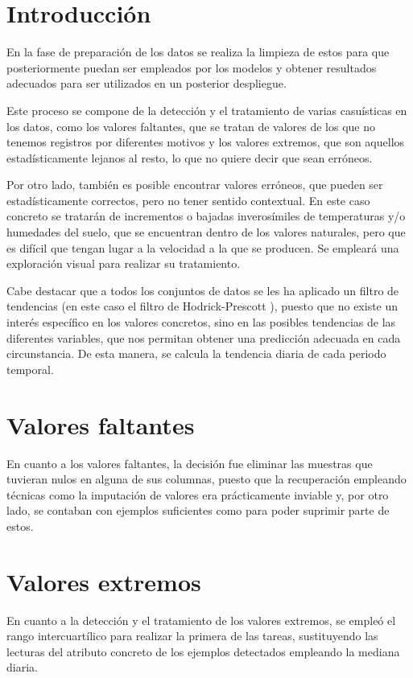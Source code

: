 
\section{Introducción}
En la fase de preparación de los datos se realiza la limpieza de estos para 
que posteriormente puedan ser empleados por los modelos y obtener resultados adecuados
para ser utilizados en un posterior despliegue.

Este proceso se compone de la detección y el tratamiento de varias casuísticas en 
los datos, como los valores faltantes, que se tratan de valores de los que no tenemos
registros por diferentes motivos y los valores extremos, que son aquellos
estadísticamente lejanos al resto, lo que no quiere decir que sean erróneos.

Por otro lado, también es posible encontrar valores erróneos, que pueden ser 
estadísticamente correctos, pero no tener sentido contextual. En este
caso concreto se tratarán de incrementos o bajadas inverosímiles de temperaturas 
y/o humedades del suelo, que se encuentran dentro de los valores naturales,
pero que es difícil que tengan lugar a la velocidad a la que se producen.
Se empleará una exploración visual para realizar su tratamiento. 

Cabe destacar que a todos los conjuntos de datos se les ha aplicado un filtro de 
tendencias (en este caso el filtro de Hodrick-Prescott \cite{misc:wikipediaHodrick2023}), 
puesto que no existe un interés específico en los valores concretos, sino en las posibles 
tendencias de las diferentes variables, que nos permitan obtener una predicción adecuada 
en cada circunstancia.
De esta manera, se calcula la tendencia diaria de cada periodo temporal.

\section{Valores faltantes}
En cuanto a los valores faltantes, la decisión fue eliminar las muestras que tuvieran
nulos en alguna de sus columnas, puesto que la recuperación empleando técnicas
como la imputación de valores era prácticamente inviable y, por otro lado, se contaban
con ejemplos suficientes como para poder suprimir parte de estos.

\section{Valores extremos}
En cuanto a la detección y el tratamiento de los valores extremos, se empleó el 
rango intercuartílico para realizar la primera de las tareas, sustituyendo las lecturas
del atributo concreto de los ejemplos detectados empleando la mediana diaria.


